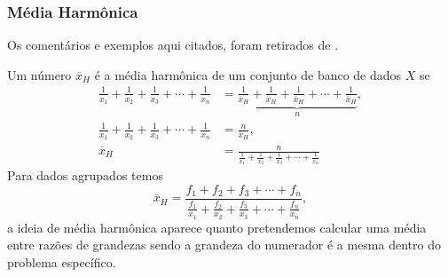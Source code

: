 \subsubsection{Média Harmônica}
Os comentários e exemplos aqui citados, foram retirados de \cite{hariki1996media}.

Um número $\overline{x}_H$ é a média harmônica de um conjunto de banco de dados $X$ se 
\begin{align}
    \label{harmonica}
    \frac{1}{x_1} + \frac{1}{x_2} + \frac{1}{x_3} + \cdots + \frac{1}{x_n} &= \underbrace{\frac{1}{\overline{x}_H} + \frac{1}{\overline{x}_H} + \frac{1}{\overline{x}_H} + \cdots + \frac{1}{\overline{x}_H}}_{n},\\
    \label{harmonica2}
    \frac{1}{x_1} + \frac{1}{x_2} + \frac{1}{x_3} + \cdots + \frac{1}{x_n} &= \frac{n}{\overline{x}_H},\\ 
    \label{harmonica3}
    \overline{x}_H &= \frac{n}{\frac{1}{x_1} + \frac{1}{x_2} + \frac{1}{x_3} + \cdots + \frac{1}{x_n}}
\end{align}
Para dados agrupados temos 
\begin{equation}
    \overline{x}_H = \frac{f_1 + f_2 + f_3 + \cdots + f_n}{\frac{f_1}{x_1} + \frac{f_2}{x_2} + \frac{f_3}{x_3} + \cdots + \frac{f_n}{x_n}},
\end{equation}
a ideia de média harmônica aparece quanto pretendemos calcular uma média entre razões de grandezas sendo a grandeza do numerador é a mesma dentro do problema específico. 

